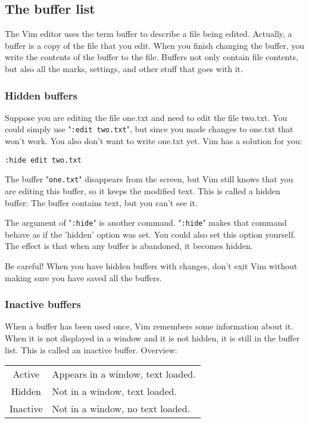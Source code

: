 \subsection{The buffer list}
\label{The buffer list}
The Vim editor uses the term buffer to describe a file being edited.
Actually, a buffer is a copy of the file that you edit.
When you finish changing the buffer, you write the contents of the buffer to the file.
Buffers not only contain file contents, but also all the marks, settings, and other stuff that goes with it.
\subsubsection{Hidden buffers}
Suppose you are editing the file one.txt and need to edit the file two.txt.
You could simply use "\verb!:edit two.txt!", but since you made changes to one.txt that won't work.
You also don't want to write one.txt yet.
Vim has a solution for you:

\begin{Verbatim}[samepage=true]
 :hide edit two.txt
\end{Verbatim}

The buffer "\verb!one.txt!" disappears from the screen, but Vim still knows that you are editing this buffer, so it keeps the modified text.
This is called a hidden buffer: The buffer contains text, but you can't see it.

The argument of "\verb!:hide!" is another command.
"\verb!:hide!" makes that command behave as if the 'hidden' option was set.
You could also set this option yourself.
The effect is that when any buffer is abandoned, it becomes hidden.

Be careful!  When you have hidden buffers with changes, don't exit Vim without making sure you have saved all the buffers.
\subsubsection{Inactive buffers}
When a buffer has been used once, Vim remembers some information about it.
When it is not displayed in a window and it is not hidden, it is still in the buffer list.
This is called an inactive buffer.
Overview:

\begin{center} \begin{tabular}{c l}
				Active & Appears in a window, text loaded. \\
				Hidden & Not in a window, text loaded. \\
				Inactive & Not in a window, no text loaded. \\
\end{tabular} \end{center}

